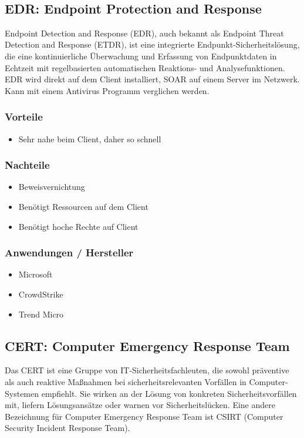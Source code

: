 \vfill
$ $
\columnbreak


\subsection{EDR: Endpoint Protection and Response}\label{subsec:edr}
Endpoint Detection and Response (EDR), auch bekannt als Endpoint Threat Detection and Response (ETDR), ist eine integrierte Endpunkt-Sicherheitslösung, die eine kontinuierliche Überwachung und Erfassung von Endpunktdaten in Echtzeit mit regelbasierten automatischen Reaktions- und Analysefunktionen.
EDR wird direkt auf dem Client installiert, SOAR auf einem Server im Netzwerk. Kann mit einem Antivirus Programm verglichen werden.

\subsubsection{Vorteile}
\begin{itemize}
    \item Sehr nahe beim Client, daher so schnell
\end{itemize}

\subsubsection{Nachteile}
\begin{itemize}
    \item Beweisvernichtung
    \item Benötigt Ressourcen auf dem Client
    \item Benötigt hoche Rechte auf Client
\end{itemize}

\subsubsection{Anwendungen / Hersteller}
\begin{itemize}
    \item Microsoft
    \item CrowdStrike
    \item Trend Micro
\end{itemize}


\subsection{CERT: Computer Emergency Response Team}
Das CERT ist eine Gruppe von IT-Sicherheitsfachleuten, die sowohl präventive als auch reaktive Maßnahmen bei sicherheitsrelevanten Vorfällen in Computer-Systemen empfiehlt.
Sie wirken an der Lösung von konkreten Sicherheitsvorfällen mit, liefern Lösungsansätze oder warnen vor Sicherheitslücken.
Eine andere Bezeichnung für Computer Emergency Response Team ist CSIRT (Computer Security Incident Response Team).

